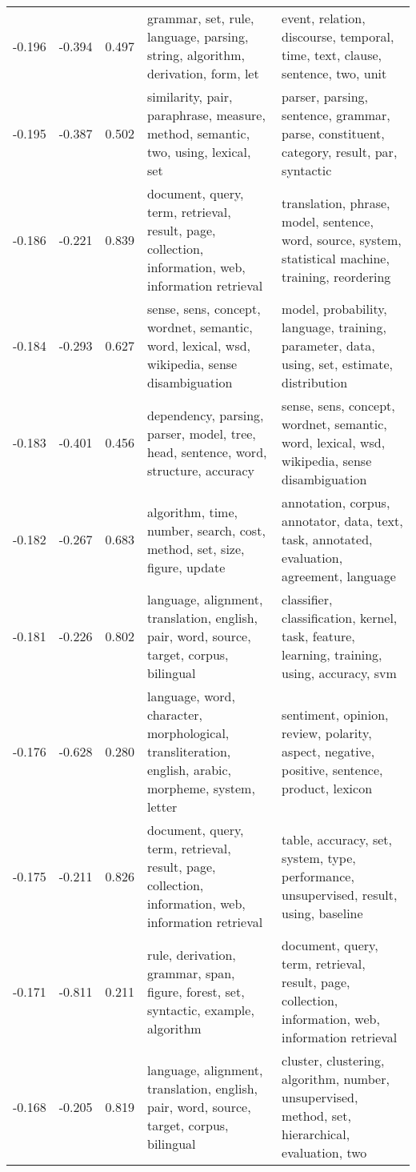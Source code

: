 \begin{tabular}{cccp{5cm}p{5cm}}
-0.196 & -0.394 & 0.497 & grammar, set, rule, language, parsing, string, algorithm, derivation, form, let & event, relation, discourse, temporal, time, text, clause, sentence, two, unit \\
-0.195 & -0.387 & 0.502 & similarity, pair, paraphrase, measure, method, semantic, two, using, lexical, set & parser, parsing, sentence, grammar, parse, constituent, category, result, par, syntactic \\
-0.186 & -0.221 & 0.839 & document, query, term, retrieval, result, page, collection, information, web, information retrieval & translation, phrase, model, sentence, word, source, system, statistical machine, training, reordering \\
-0.184 & -0.293 & 0.627 & sense, sens, concept, wordnet, semantic, word, lexical, wsd, wikipedia, sense disambiguation & model, probability, language, training, parameter, data, using, set, estimate, distribution \\
-0.183 & -0.401 & 0.456 & dependency, parsing, parser, model, tree, head, sentence, word, structure, accuracy & sense, sens, concept, wordnet, semantic, word, lexical, wsd, wikipedia, sense disambiguation \\
-0.182 & -0.267 & 0.683 & algorithm, time, number, search, cost, method, set, size, figure, update & annotation, corpus, annotator, data, text, task, annotated, evaluation, agreement, language \\
-0.181 & -0.226 & 0.802 & language, alignment, translation, english, pair, word, source, target, corpus, bilingual & classifier, classification, kernel, task, feature, learning, training, using, accuracy, svm \\
-0.176 & -0.628 & 0.280 & language, word, character, morphological, transliteration, english, arabic, morpheme, system, letter & sentiment, opinion, review, polarity, aspect, negative, positive, sentence, product, lexicon \\
-0.175 & -0.211 & 0.826 & document, query, term, retrieval, result, page, collection, information, web, information retrieval & table, accuracy, set, system, type, performance, unsupervised, result, using, baseline \\
-0.171 & -0.811 & 0.211 & rule, derivation, grammar, span, figure, forest, set, syntactic, example, algorithm & document, query, term, retrieval, result, page, collection, information, web, information retrieval \\
-0.168 & -0.205 & 0.819 & language, alignment, translation, english, pair, word, source, target, corpus, bilingual & cluster, clustering, algorithm, number, unsupervised, method, set, hierarchical, evaluation, two \\

\end{tabular}
